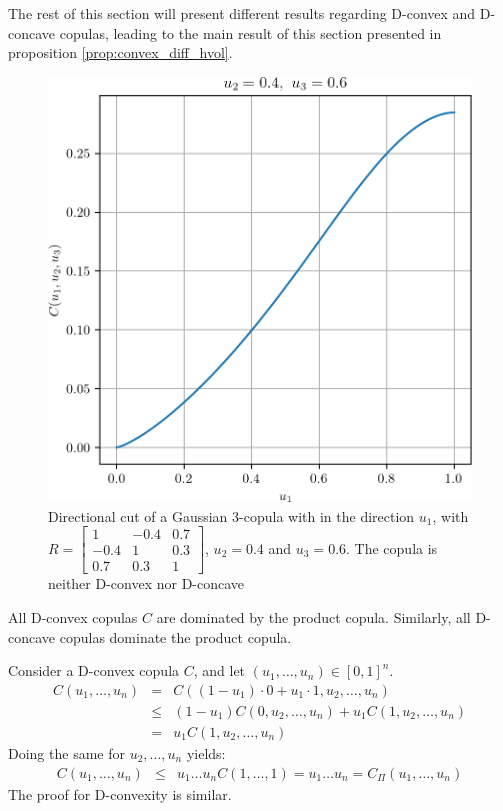 The rest of this section will present different results regarding D-convex and D-concave copulas, leading to the main result of this section presented in proposition \ref{prop:convex_diff_hvol}.

\begin{figure}
    \centering
    \includegraphics[width=0.5\linewidth]{Images/Guassian_copula/gaussian_copula_n3.png}
    \caption{Directional cut of a Gaussian 3-copula with in the direction $u_1$, with $R=\begin{bmatrix} 1 & -0.4 & 0.7\\ -0.4 & 1 & 0.3\\ 0.7 & 0.3 & 1 \end{bmatrix}$, $u_2=0.4$ and $u_3=0.6$. The copula is neither D-convex nor D-concave}
    \label{fig:gaussian_copula_simu_n3}
\end{figure}

\begin{remark}
    All D-convex copulas $C$ are dominated by the product copula. Similarly, all D-concave copulas dominate the product copula.

    Consider a D-convex copula $C$, and let $(u_1, \dots, u_n)\in[0,1]^n$.
    \begin{eqnarray*}
        C(u_1,\dots, u_n) &=& C((1-u_1)\cdot0+u_1\cdot 1, u_2, \dots, u_n)\\
        &\leqslant& (1-u_1)C(0, u_2,\dots, u_n)+u_1C(1, u_2, \dots, u_n)\\
        &=& u_1C(1, u_2,\dots, u_n)
    \end{eqnarray*}
    Doing the same for $u_2,\dots,u_n$ yields:
    \begin{eqnarray*}
        C(u_1,\dots, u_n) &\leqslant& u_1\dots u_nC(1,\dots,1) = u_1\dots u_n = C_\Pi(u_1,\dots,u_n)
    \end{eqnarray*}
    The proof for D-convexity is similar.
\end{remark}

